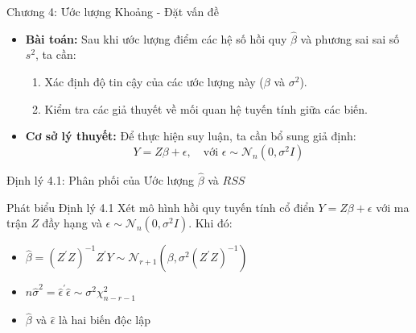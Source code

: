 \begin{frame}{Chương 4: Ước lượng Khoảng - Đặt vấn đề}

    \begin{itemize}
        \item \textbf{Bài toán:} Sau khi ước lượng điểm các hệ số hồi quy $\hat{\beta}$ và phương sai sai số $s^2$, ta cần:
        \begin{enumerate}
            \item Xác định độ tin cậy của các ước lượng này ($\beta$ và $\sigma^2$).
            \item Kiểm tra các giả thuyết về mối quan hệ tuyến tính giữa các biến.
        \end{enumerate}
        
        \item \textbf{Cơ sở lý thuyết:} Để thực hiện suy luận, ta cần bổ sung giả định:
        \[
            Y = Z\beta + \epsilon, \quad \text{với } \epsilon \sim \mathcal{N}_n(0, \sigma^2 I)
        \]
    \end{itemize}
\end{frame}

\begin{frame}{Định lý 4.1: Phân phối của Ước lượng $\hat{\beta}$ và $RSS$}

    \begin{block}{Phát biểu Định lý 4.1}
        Xét mô hình hồi quy tuyến tính cổ điển $Y=Z\beta+\epsilon$ với ma trận $Z$ đầy hạng và $\epsilon \sim \mathcal{N}_n(0,\sigma^2I)$.
        Khi đó:
        \begin{itemize}
            \item $\hat{\beta}=(Z^{\prime}Z)^{-1}Z^{\prime}Y\sim\mathcal{N}_{r+1}(\beta,\sigma^{2}(Z^{\prime}Z)^{-1})$
            \item $n\hat{\sigma}^{2}=\hat{\epsilon}^{\prime}\hat{\epsilon}\sim\sigma^{2}\chi_{n-r-1}^{2}$
            \item $\hat{\beta}$ và $\hat{\epsilon}$ là hai biến độc lập
        \end{itemize}
    \end{block}
\end{frame}

